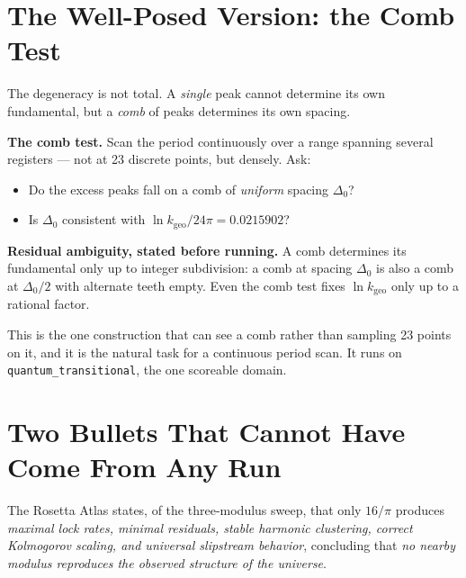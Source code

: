 \documentclass[11pt, letterpaper, openany]{book}
\newcommand{\kgeo}{k_{\mathrm{geo}}}
\begin{document}
\section{The Well-Posed Version: the Comb Test}

The degeneracy is not total. A \emph{single} peak cannot determine its own fundamental, but a
\emph{comb} of peaks determines its own spacing.

\begin{predictionbox}
\textbf{The comb test.} Scan the period continuously over a range spanning several registers ---
not at 23 discrete points, but densely. Ask:

\begin{itemize}
    \item Do the excess peaks fall on a comb of \emph{uniform} spacing $\Delta_0$?
    \item Is $\Delta_0$ consistent with $\ln \kgeo / 24\pi = 0.0215902$?
\end{itemize}

\textbf{Residual ambiguity, stated before running.} A comb determines its fundamental only up to
integer subdivision: a comb at spacing $\Delta_0$ is also a comb at $\Delta_0/2$ with alternate
teeth empty. Even the comb test fixes $\ln \kgeo$ only up to a rational factor.
\end{predictionbox}

This is the one construction that can see a comb rather than sampling 23 points on it, and it is
the natural task for a continuous period scan. It runs on \texttt{quantum\_transitional}, the one
scoreable domain.

\section{Two Bullets That Cannot Have Come From Any Run}

The Rosetta Atlas states, of the three-modulus sweep, that only $16/\pi$ produces \emph{maximal
lock rates, minimal residuals, stable harmonic clustering, correct Kolmogorov scaling, and
universal slipstream behavior}, concluding that \emph{no nearby modulus reproduces the observed
structure of the universe}.
\end{document}
